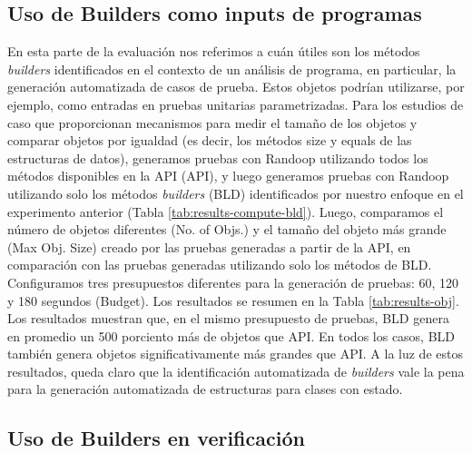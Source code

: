\subsection{Uso de Builders como inputs de programas}
En esta parte de la evaluación nos referimos a cuán útiles son los métodos \emph{builders} identificados en el contexto de un análisis de programa, en particular, la generación automatizada de casos de prueba. Estos objetos podrían utilizarse, por ejemplo, como entradas en pruebas unitarias parametrizadas. Para los estudios de caso que proporcionan mecanismos para medir el tamaño de los objetos y comparar objetos por igualdad (es decir, los métodos size y equals de las estructuras de datos), generamos pruebas con Randoop utilizando todos los métodos disponibles en la API (API), y luego generamos pruebas con Randoop utilizando solo los métodos \emph{builders} (BLD) identificados por nuestro enfoque en el experimento anterior (Tabla \ref{tab:results-compute-bld}). Luego, comparamos el número de objetos diferentes (No. of Objs.) y el tamaño del objeto más grande (Max Obj. Size) creado por las pruebas generadas a partir de la API, en comparación con las pruebas generadas utilizando solo los métodos de BLD. Configuramos tres presupuestos diferentes para la generación de pruebas: 60, 120 y 180 segundos (Budget). Los resultados se resumen en la Tabla \ref{tab:results-obj}. Los resultados muestran que, en el mismo presupuesto de pruebas, BLD genera en promedio un 500 porciento más de objetos que API. En todos los casos, BLD también genera objetos significativamente más grandes que API. A la luz de estos resultados, queda claro que la identificación automatizada de \emph{builders} vale la pena para la generación automatizada de estructuras para clases con estado.


\subsection{Uso de Builders en verificación}

